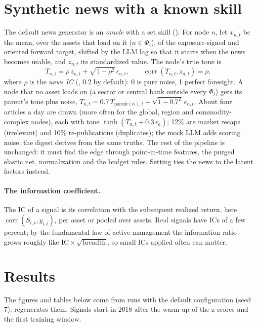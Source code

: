 \section{Synthetic news with a known skill}\label{sec:rb-oracle}
The default news generator is an \emph{oracle} with a set skill (). For node $n$, let
$x_{n,t}$ be the mean, over the assets that load on it ($n\in\Phi_i$), of the exposure-signed and oriented forward target, shifted by the LLM lag so that it starts when
the news becomes usable, and $z_{n,t}$ its standardized value. The node's true tone is
\[
  T_{n,t}=\rho\,z_{n,t}+\sqrt{1-\rho^2}\,\epsilon_{n,t},\qquad\operatorname{corr}(T_{n,t},z_{n,t})=\rho ,
\]
where $\rho$ is the \emph{news IC} (, 0.2 by default): 0 is pure noise, 1 perfect
foresight. A node that no asset loads on (a sector or central bank outside every $\Phi_i$) gets its parent's
tone plus noise, $T_{n,t}=0.7\,T_{\text{parent}(n),t}+\sqrt{1-0.7^2}\,\epsilon_{n,t}$. About four articles a day are drawn (more often for the global, region and commodity-complex nodes), each with tone
$\tanh(T_{n,t}+0.3\,\epsilon_a)$; 12\% are market recaps (irrelevant) and 10\% re-publications (duplicates); the mock
LLM adds scoring noise; the digest derives from the same truths. The rest of the pipeline is unchanged: it must find
the edge through point-in-time features, the purged elastic net, normalization and the budget rules. Setting
 ties the news to the latent factors instead.

\paragraph{The information coefficient.} The IC of a signal is its correlation with the subsequent realized return,
here $\operatorname{corr}(S_{i,t},y_{i,t})$, per asset or pooled over assets. Real signals have ICs of a few percent;
by the fundamental law of active management the information ratio grows roughly like
$\mathrm{IC}\times\sqrt{\text{breadth}}$, so small ICs applied often can matter.

\section{Results}
The figures and tables below come from runs with the default configuration (seed 7); 
regenerates them. Signals start in 2018 after the warm-up of the z-scores and the first training window.

